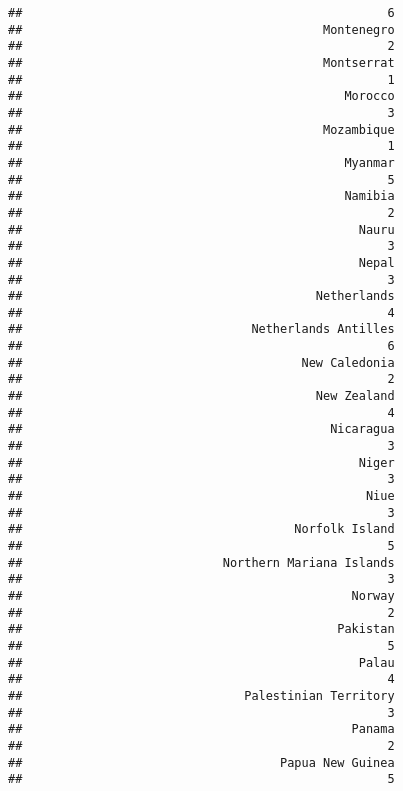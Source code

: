 \documentclass[
]{article}
\begin{document}
\begin{verbatim}
##                                                   6 
##                                          Montenegro 
##                                                   2 
##                                          Montserrat 
##                                                   1 
##                                             Morocco 
##                                                   3 
##                                          Mozambique 
##                                                   1 
##                                             Myanmar 
##                                                   5 
##                                             Namibia 
##                                                   2 
##                                               Nauru 
##                                                   3 
##                                               Nepal 
##                                                   3 
##                                         Netherlands 
##                                                   4 
##                                Netherlands Antilles 
##                                                   6 
##                                       New Caledonia 
##                                                   2 
##                                         New Zealand 
##                                                   4 
##                                           Nicaragua 
##                                                   3 
##                                               Niger 
##                                                   3 
##                                                Niue 
##                                                   3 
##                                      Norfolk Island 
##                                                   5 
##                            Northern Mariana Islands 
##                                                   3 
##                                              Norway 
##                                                   2 
##                                            Pakistan 
##                                                   5 
##                                               Palau 
##                                                   4 
##                               Palestinian Territory 
##                                                   3 
##                                              Panama 
##                                                   2 
##                                    Papua New Guinea 
##                                                   5 

\end{verbatim}
\end{document}
